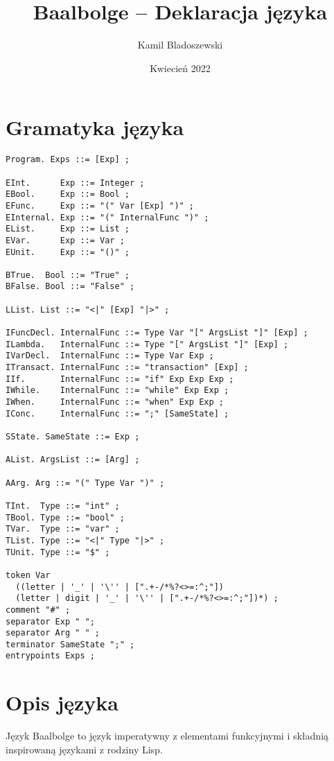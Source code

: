 \documentclass{article}
\title{Baalbolge -- Deklaracja języka}
\author{Kamil Bladoszewski}
\date{Kwiecień 2022}
\begin{document}
\maketitle

\tableofcontents

\pagebreak

\section{Gramatyka języka}

\begin{lstlisting}
Program. Exps ::= [Exp] ;

EInt.      Exp ::= Integer ;
EBool.     Exp ::= Bool ;
EFunc.     Exp ::= "(" Var [Exp] ")" ;
EInternal. Exp ::= "(" InternalFunc ")" ;
EList.     Exp ::= List ;
EVar.      Exp ::= Var ;
EUnit.     Exp ::= "()" ;

BTrue.  Bool ::= "True" ;
BFalse. Bool ::= "False" ;

LList. List ::= "<|" [Exp] "|>" ;

IFuncDecl. InternalFunc ::= Type Var "[" ArgsList "]" [Exp] ;
ILambda.   InternalFunc ::= Type "[" ArgsList "]" [Exp] ;
IVarDecl.  InternalFunc ::= Type Var Exp ;
ITransact. InternalFunc ::= "transaction" [Exp] ;
IIf.       InternalFunc ::= "if" Exp Exp Exp ;
IWhile.    InternalFunc ::= "while" Exp Exp ;
IWhen.     InternalFunc ::= "when" Exp Exp ;
IConc.     InternalFunc ::= ";" [SameState] ;

SState. SameState ::= Exp ;

AList. ArgsList ::= [Arg] ;

AArg. Arg ::= "(" Type Var ")" ;

TInt.  Type ::= "int" ;
TBool. Type ::= "bool" ;
TVar.  Type ::= "var" ;
TList. Type ::= "<|" Type "|>" ;
TUnit. Type ::= "$" ;

token Var
  ((letter | '_' | '\'' | [".+-/*%?<>=:^;"])
  (letter | digit | '_' | '\'' | [".+-/*%?<>=:^;"])*) ;
comment "#" ;
separator Exp " ";
separator Arg " " ;
terminator SameState ";" ;
entrypoints Exps ;

\end{lstlisting}

\pagebreak

\section{Opis języka}

Język Baalbolge to język imperatywny z elementami funkcyjnymi i składnią inspirowaną językami z rodziny Lisp.
\end{document}
